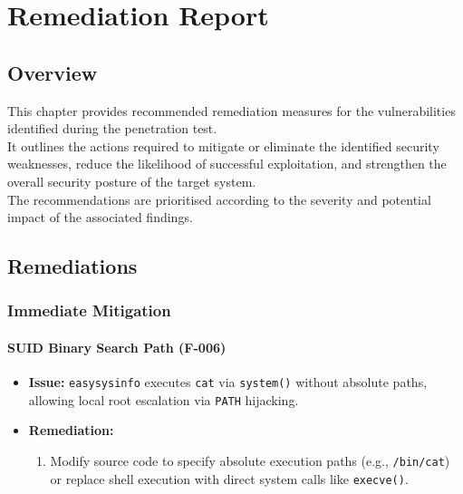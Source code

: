 \chapter{Remediation Report}

\section{Overview}

This chapter provides recommended remediation measures for the vulnerabilities identified during the penetration test. 
\\

It outlines the actions required to mitigate or eliminate the identified security weaknesses, reduce the likelihood of successful exploitation, and strengthen the overall security posture of the target system. 
\\

The recommendations are prioritised according to the severity and potential impact of the associated findings.

\section{Remediations}

\subsection{Immediate Mitigation}

\subsubsection{SUID Binary Search Path (F-006)}
\begin{itemize}
    \item \textbf{Issue:} \texttt{easysysinfo} executes \texttt{cat} via \texttt{system()} without absolute paths, allowing local root escalation via \texttt{PATH} hijacking.
    \item \textbf{Remediation:}
    \begin{enumerate}
        \item Modify source code to specify absolute execution paths (e.g., \texttt{/bin/cat}) or replace shell execution with direct system calls like \texttt{execve()}.
    \end{enumerate}
\end{itemize}

